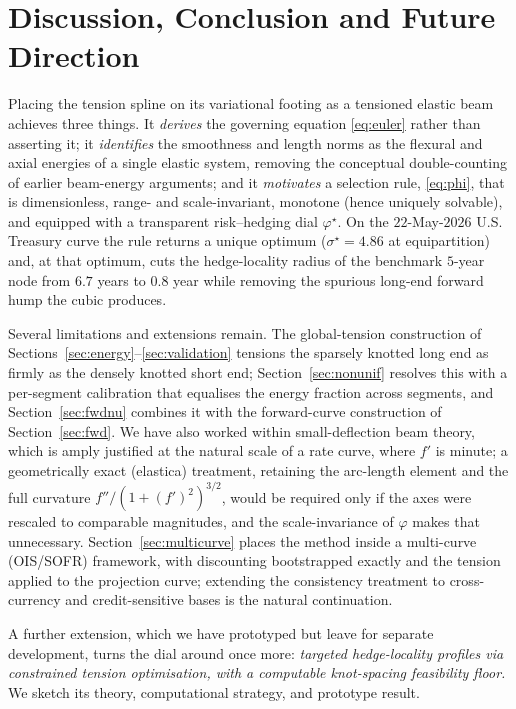 \documentclass[]{interact}
\theoremstyle{plain}
\begin{document}
\section{Discussion, Conclusion and Future Direction}\label{sec:discussion}
Placing the tension spline on its variational footing as a tensioned elastic beam achieves
three things. It \emph{derives} the governing equation \eqref{eq:euler} rather than asserting
it; it \emph{identifies} the smoothness and length norms as the flexural and axial energies of a
single elastic system, removing the conceptual double-counting of earlier beam-energy arguments;
and it \emph{motivates} a selection rule, \eqref{eq:phi}, that is dimensionless, range- and
scale-invariant, monotone (hence uniquely solvable), and equipped with a transparent
risk--hedging dial $\varphi^\star$. On the $22$-May-$2026$ U.S. Treasury curve the rule returns
a unique optimum ($\sigma^\star=4.86$ at equipartition) and, at that optimum, cuts the
hedge-locality radius of the benchmark $5$-year node from $6.7$ years to $0.8$ year while
removing the spurious long-end forward hump the cubic produces.

Several limitations and extensions remain. The global-tension construction of
Sections~\ref{sec:energy}--\ref{sec:validation} tensions the sparsely knotted long end as firmly
as the densely knotted short end; Section~\ref{sec:nonunif} resolves this with a per-segment
calibration that equalises the energy fraction across segments, and Section~\ref{sec:fwdnu}
combines it with the forward-curve construction of Section~\ref{sec:fwd}. We have
also worked within small-deflection beam theory, which is amply justified at the natural scale of
a rate curve, where $f'$ is minute; a geometrically exact (elastica) treatment, retaining the
arc-length element and the full curvature $f''/(1+(f')^2)^{3/2}$, would be required only if the
axes were rescaled to comparable magnitudes, and the scale-invariance of $\varphi$ makes that
unnecessary. Section~\ref{sec:multicurve} places the method inside a multi-curve (OIS/SOFR)
framework, with discounting bootstrapped exactly and the tension applied to the projection
curve; extending the consistency treatment to cross-currency and credit-sensitive bases is the
natural continuation.

A further extension, which we have prototyped but leave for separate development, turns the dial
around once more: \emph{targeted hedge-locality profiles via constrained tension optimisation,
with a computable knot-spacing feasibility floor.} We sketch its theory, computational strategy,
and prototype result.
\end{document}
